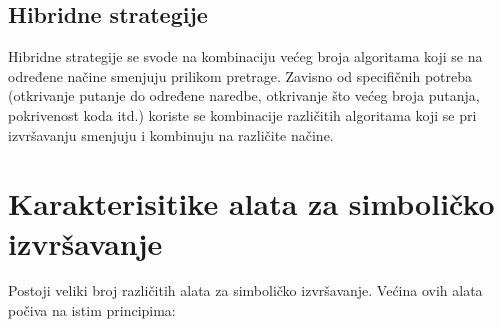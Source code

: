 \documentclass[12pt,oneside]{memoir}
\begin{document}
\subsection{Hibridne strategije} 
Hibridne strategije se svode na kombinaciju većeg broja algoritama koji se na određene načine smenjuju prilikom pretrage. Zavisno od specifičnih potreba (otkrivanje putanje do određene naredbe, otkrivanje što većeg broja putanja, pokrivenost koda itd.) koriste se kombinacije različitih algoritama koji se pri izvršavanju smenjuju i kombinuju na različite načine.

\section{Karakterisitike alata za simboličko izvršavanje} \label{osobine_alata}

Postoji veliki broj različitih alata za simboličko izvršavanje. Većina ovih alata počiva na istim principima:
\end{document}
